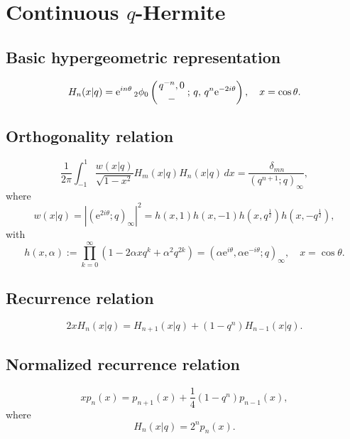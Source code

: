 \documentclass[envcountchap,graybox]{svmono}
\newcommand{\qhyp}[5]{\mbox{}_{#1}{\phi}_{#2}
\left(\genfrac{}{}{0pt}{}{#3}{#4}\,;\,q,\,#5\right)}
\newcommand{\e}{\textrm{e}}
\newcommand{\qhyp}[5]{\,\mbox{}_{#1}\phi_{#2}\!\left(
  \genfrac{}{}{0pt}{}{#3}{#4};#5\right)}
\begin{document}
{{\section{Continuous $q$-Hermite}
\par\setcounter{equation}{0}

\subsection*{Basic hypergeometric representation}
\begin{equation}
\label{DefContqHermite}
H_n(x|q)=\e^{in\theta}\,\qhyp{2}{0}{q^{-n},0}{-}{q^n\e^{-2i\theta}},
\quad x=\cos\theta.
\end{equation}

\newpage

\subsection*{Orthogonality relation}
\begin{equation}
\label{OrtContqHermite}
\frac{1}{2\pi}\int_{-1}^1\frac{w(x|q)}{\sqrt{1-x^2}}H_m(x|q)H_n(x|q)\,dx=
\frac{\,\delta_{mn}}{(q^{n+1};q)_{\infty}},
\end{equation}
where
$$w(x|q)=\left|\left(\e^{2i\theta};q\right)_{\infty}\right|^2=h(x,1)h(x,-1)
h(x,q^{\frac{1}{2}})h(x,-q^{\frac{1}{2}}),$$
with
$$h(x,\alpha):=\prod_{k=0}^{\infty}\left(1-2\alpha xq^k+\alpha^2q^{2k}\right)
=\left(\alpha\e^{i\theta},\alpha\e^{-i\theta};q\right)_{\infty},\quad x=\cos\theta.$$

\subsection*{Recurrence relation}
\begin{equation}
\label{RecContqHermite}
2xH_n(x|q)=H_{n+1}(x|q)+(1-q^n)H_{n-1}(x|q).
\end{equation}

\subsection*{Normalized recurrence relation}
\begin{equation}
\label{NormRecContqHermite}
xp_n(x)=p_{n+1}(x)+\frac{1}{4}(1-q^n)p_{n-1}(x),
\end{equation}
where
$$H_n(x|q)=2^np_n(x).$$

}}
\end{document}
